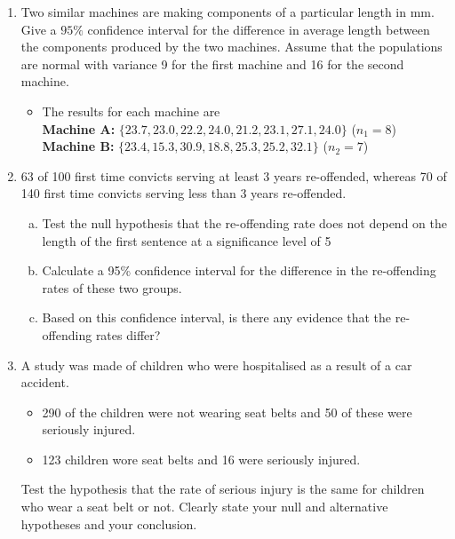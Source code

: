 \documentclass[]{article}
\begin{document}
\begin{enumerate}
	\item Two similar machines are making components of a particular length
	in mm. Give a $95\%$ confidence interval for the difference in average length between
	the components produced by the two machines. Assume that the populations are normal
	with variance 9 for the first machine and 16 for the second machine.
	\begin{itemize}
	\item The results for each machine are\\ \bigskip
	\textbf{Machine A:} $\{ 23.7, 23.0, 22.2, 24.0, 21.2, 23.1, 27.1, 24.0 \}   $ ($n_1= 8$)\\ \bigskip
	\textbf{Machine B:} $\{23.4, 15.3, 30.9, 18.8, 25.3, 25.2, 32.1\}$  ($n_2=7$) \\
\end{itemize}


\item 
63 of 100 first time convicts serving at least 3 years re-offended, whereas 70 of 140 first time convicts serving less than 3 years re-offended. 
\begin{enumerate}[(a)]
\item	Test the null hypothesis that the re-offending rate does not depend on the length of the first sentence at a significance level of 5%
\item 	Calculate a 95\% confidence interval for the difference in the re-offending rates of these two groups.
\item 	Based on this confidence interval, is there any evidence that the re-offending rates differ? 
\end{enumerate}

\item 
A study was made of children who were hospitalised as a result of a car accident. 
\begin{itemize}
	\item 290 of the children were not wearing seat belts and 50 of these were seriously injured. 
	\item 123 children wore seat belts and 16 were seriously injured. 
	
\end{itemize}

Test the hypothesis that the rate of serious injury is the same for children who wear a seat belt or not. Clearly state your null and alternative hypotheses and your conclusion.

\end{enumerate}
\end{document}
